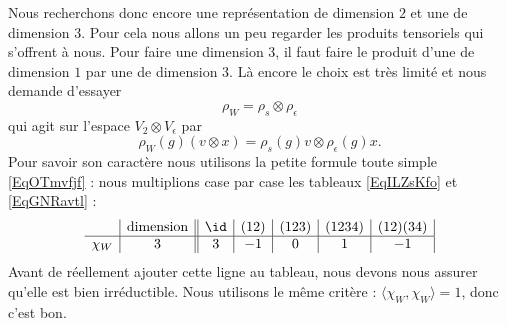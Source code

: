 Nous recherchons donc encore une représentation de dimension \( 2\) et une de dimension \( 3\). Pour cela nous allons un peu regarder les produits tensoriels qui s'offrent à nous. Pour faire une dimension \( 3\), il faut faire le produit d'une de dimension \( 1\) par une de dimension \( 3\). Là encore le choix est très limité et nous demande d'essayer
\begin{equation}
    \rho_W=\rho_s\otimes \rho_{\epsilon}
\end{equation}
qui agit sur l'espace \( V_2\otimes V_{\epsilon}\) par
\begin{equation}
    \rho_W(g)(v\otimes x)=\rho_s(g)v\otimes \rho_{\epsilon}(g)x.
\end{equation}
Pour savoir son caractère nous utilisons la petite formule toute simple \eqref{EqOTmvfjf} : nous multiplions case par case les tableaux \eqref{EqILZsKfo} et \eqref{EqGNRavtl} :
\begin{equation}
    \begin{array}[]{c|c||c|c|c|c|c|}
        &\text{dimension}&\id&(12)&(123)&(1234)&(12)(34)\\
          \hline
          \chi_{W}&3&3&-1&0&1&-1\\
    \end{array}
\end{equation}
Avant de réellement ajouter cette ligne au tableau, nous devons nous assurer qu'elle est bien irréductible. Nous utilisons le même critère : \( \langle \chi_W, \chi_W\rangle =1\), donc c'est bon.


